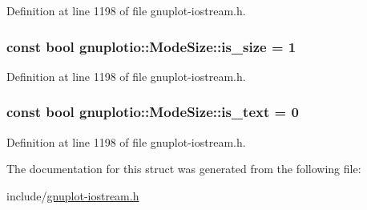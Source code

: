 Definition at line 1198 of file gnuplot-\/iostream.\+h.

\subsubsection[{\texorpdfstring{is\+\_\+size}{is_size}}]{\setlength{\rightskip}{0pt plus 5cm}const bool gnuplotio\+::\+Mode\+Size\+::is\+\_\+size = 1\hspace{0.3cm}{\ttfamily [static]}}\hypertarget{structgnuplotio_1_1_mode_size_aa20ae9f1ce222504489db33d13eb46c0}{}\label{structgnuplotio_1_1_mode_size_aa20ae9f1ce222504489db33d13eb46c0}


Definition at line 1198 of file gnuplot-\/iostream.\+h.

\subsubsection[{\texorpdfstring{is\+\_\+text}{is_text}}]{\setlength{\rightskip}{0pt plus 5cm}const bool gnuplotio\+::\+Mode\+Size\+::is\+\_\+text = 0\hspace{0.3cm}{\ttfamily [static]}}\hypertarget{structgnuplotio_1_1_mode_size_aa01840f76877ae7c8bad254dae28e32c}{}\label{structgnuplotio_1_1_mode_size_aa01840f76877ae7c8bad254dae28e32c}


Definition at line 1198 of file gnuplot-\/iostream.\+h.



The documentation for this struct was generated from the following file\+:\begin{DoxyCompactItemize}
\item 
include/\hyperlink{gnuplot-iostream_8h}{gnuplot-\/iostream.\+h}\end{DoxyCompactItemize}
